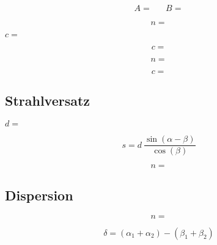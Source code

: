 \begin{align*}
	A =  && B = 
\end{align*}

\begin{equation*}
	n = 
\end{equation*}

$c = $

\begin{equation*}
	c = 
\end{equation*}

\begin{table}[H]
	\centering
	\caption{}
	
	\label{tab:brechung}
\end{table}

\begin{equation*}
	n = 
\end{equation*}

\begin{equation*}
	c = 
\end{equation*}


\subsection{Strahlversatz}

$d = $

\begin{equation*}
	s = d \: \frac{\sin(\alpha - \beta)}{\cos(\beta)}
\end{equation*}

\begin{equation*}
	n = 
\end{equation*}

\begin{table}[H]
	\centering
	\caption{}
	
	\label{tab:plan}
\end{table}


\subsection{Dispersion}

\begin{equation*}
	n = 
\end{equation*}

\begin{equation*}
	\delta = (\alpha_1 + \alpha_2) - (\beta_1 + \beta_2)
\end{equation*}


